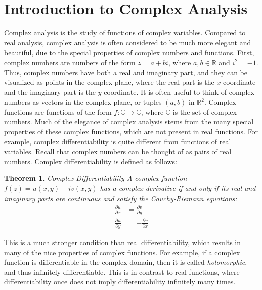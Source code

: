 \documentclass[12pt,letterpaper]{article}
\newtheorem{theorem}{Theorem}
\begin{document}
\section{Introduction to Complex Analysis}
Complex analysis is the study of functions of complex variables.
Compared to real analysis, complex analysis is often considered to be much more elegant and beautiful, due to the special properties of complex numbers and functions.
First, complex numbers are numbers of the form $z = a + bi$, where $a, b \in \mathbb{R}$ and $i^2 = -1$. \cite{WeissteinComplexNumber}
Thus, complex numbers have both a real and imaginary part, and they can be visualized as points in the complex plane, where the real part is the $x$-coordinate and the imaginary part is the $y$-coordinate.
It is often useful to think of complex numbers as vectors in the complex plane, or tuples $(a, b)$ in $\mathbb{R}^2$.
Complex functions are functions of the form $f: \mathbb{C} \to \mathbb{C}$, where $\mathbb{C}$ is the set of complex numbers.
Much of the elegance of complex analysis stems from the many special properties of these complex functions, which are not present in real functions.
For example, complex differentiability is quite different from functions of real variables.
Recall that complex numbers can be thought of as pairs of real numbers.
Complex differentiability is defined as follows:

\begin{theorem}{Complex Differentiability}
    A complex function $f(z) = u(x, y) + iv(x, y)$ has a complex derivative if and only if its real and imaginary parts are continuous and satisfy the Cauchy-Riemann equations:
    \begin{align*}
        \frac{\partial u}{\partial x} &= \frac{\partial v}{\partial y} \\
        \frac{\partial u}{\partial y} &= -\frac{\partial v}{\partial x}
    \end{align*}
\end{theorem}

This is a much stronger condition than real differentiability, which results in many of the nice properties of complex functions.
For example, if a complex function is differentiable in the complex domain, then it is called \textit{holomorphic}, and thus infinitely differentiable. \cite{LangComplexAnalysis1998}
This is in contrast to real functions, where differentiability once does not imply differentiability infinitely many times.
\end{document}
